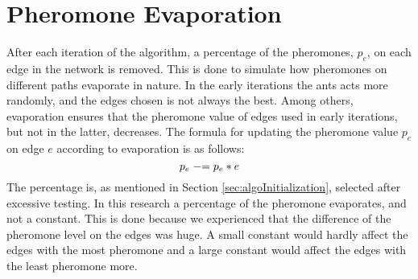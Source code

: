 \section{Pheromone Evaporation}

After each iteration of the algorithm, a percentage of the pheromones, $p_e$, on each edge in the network is removed. This is done to simulate how pheromones on different paths evaporate in nature. In the early iterations the ants acts more randomly, and the edges chosen is not always the best. Among others, evaporation ensures that the pheromone value of edges used in early iterations, but not in the latter, decreases. The formula for updating the pheromone value $p_e$ on edge $e$ according to evaporation is as follows: 
\newline
$$p_e \mathrel{-}= p_e*e$$
\newline
The percentage is, as mentioned in Section \vref{sec:algoInitialization}, selected after excessive testing. In this research a percentage of the pheromone evaporates, and not a constant. This is done because we experienced that the difference of the pheromone level on the edges was huge. A small constant would hardly affect the edges with the most pheromone and a large constant would affect the edges with the least pheromone more. 